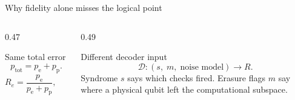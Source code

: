 \documentclass[aspectratio=169,11pt]{beamer}
\newcommand{\pe}{p_{\mathrm e}}
\newcommand{\pp}{p_{\mathrm p}}
\begin{document}
\begin{frame}{Why fidelity alone misses the logical point}
  \begin{columns}[T,onlytextwidth]
    \begin{column}{0.47\textwidth}
      \begin{block}{Same total error}
        \[
          p_{\mathrm{tot}}=\pe+\pp .
        \]
        \[
          R_e=\frac{\pe}{\pe+\pp},
          \qquad
          \eta_e=\frac{1}{1-R_e}.
        \]
      \end{block}
    \end{column}
    \begin{column}{0.49\textwidth}
      \begin{block}{Different decoder input}
        \[
          \mathcal D:
          (s,\;m,\;\text{noise model})
          \longrightarrow R .
        \]
        Syndrome \(s\) says which checks fired. Erasure flags \(m\) say
        where a physical qubit left the computational subspace.
      \end{block}
    \end{column}
  \end{columns}

  \vspace{3mm}
  \begin{center}
  \end{center}
\end{frame}
\end{document}
